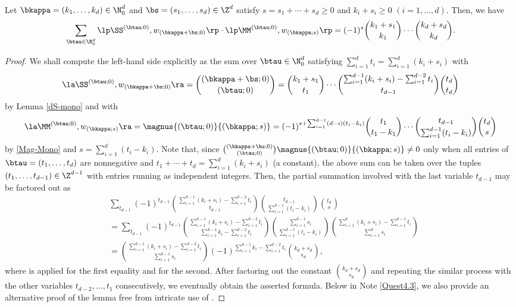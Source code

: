 \begin{Lemma} \label{lem2}
Let $\bkappa=(k_1,\dots,k_d)\in\N_0^d$ and $\bs=(s_1,\dots,s_d)\in \Z^d$
satisfy $s=s_1+\cdots+s_d\ge 0$ and $k_i+s_i\ge 0$ $(i=1,\dots,d)$.
Then,  we have
$$
\sum_{\btau\in\N_0^d} 
\lp\SS^{(\btau;0)},w_{(\bkappa+\bs;0)}\rp
\cdot \lp\MM^{(\btau;0)}, w_{(\bkappa;s)}\rp
=(-1)^s
\binom{k_1+s_1}{k_1}\cdots \binom{k_d+s_d}{k_d}.
$$
\end{Lemma}

\begin{proof}
We shall compute the left-hand side explicitly
as the sum over 
$\btau\in\N_0^d$ satisfying
$\sum_{i=1}^d t_i=\sum_{i=1}^d (k_i+s_i)$
with
$$
\la\SS^{(\btau;0)},w_{(\bkappa+\bs;0)}\ra=\binom{(\bkappa+\bs;0)}{(\btau;0)}
=\binom{k_1+s_1}{t_1} 
\cdots
\binom{\sum_{i=1}^{d-1}(k_i+s_i)-\sum_{i=1}^{d-2}t_i}{t_{d-1}}
\binom{t_d}{t_d}
$$
by Lemma \ref{dS-mono} and with
\small $$
\la\MM^{(\btau;0)}, w_{(\bkappa;s)}\ra
=\magnus{(\btau;0)}{(\bkappa;s)}
=(-1)^{s+\sum_{i=1}^{d-1}(d-i)(t_i-k_i)}
\binom{t_1}{t_1-k_1}
\cdots
\binom{t_{d-1}}{\sum_{i=1}^{d-1}(t_i-k_i)}
\binom{t_d}{s}
$$ \normalsize
by \eqref{Mag-Mono} and
$s=\sum_{i=1}^{d}(t_i-k_i)$. 
Note that,
since $\binom{(\bkappa+\bs;0)}{(\btau;0)}\magnus{(\btau;0)}{(\bkappa;s)}\ne 0$ 
only when all entries of $\btau=(t_1,\dots,t_d)$ are nonnegative
and $t_1+\cdots+t_d=\sum_{i=1}^d (k_i+s_i)$ (a constant),
the above sum
can be taken over the tuples $(t_1,\dots,t_{d-1})\in\Z^{d-1}$
with entries running as independent integers.
Then, the partial summation involved with the last variable 
$t_{d-1}$ may be factored out as
\small \begin{align*}
&\sum_{t_{d-1}}(-1)^{t_{d-1}}
\binom{\sum_{i=1}^{d-1}(k_i+s_i)-\sum_{i=1}^{d-2}t_i}{t_{d-1}}
\binom{t_{d-1}}{\sum_{i=1}^{d-1}(t_i-k_i)}
\binom{t_d}{s} \\
&=\sum_{t_{d-1}}(-1)^{t_{d-1}}
\binom{\sum_{i=1}^{d-1}(k_i+s_i)-\sum_{i=1}^{d-2}t_i}{ \sum_{i=1}^{d-1}k_i-\sum_{i=1}^{d-2}t_i }
\binom{\sum_{i=1}^{d-1} s_i}{\sum_{i=1}^{d-1}(t_i-k_i)}
\binom{\sum_{i=1}^d(k_i+s_i)-\sum_{i=1}^{d-1}t_i}{\sum_{i=1}^{d} s_i} \\
&=\binom{\sum_{i=1}^{d-1}(k_i+s_i)-\sum_{i=1}^{d-2}t_i}{\sum_{i=1}^{d-1} s_i}
(-1)^{\sum_{i=1}^{d-1}k_i -\sum_{i=1}^{d-2} t_i}
\binom{k_d+s_d}{s_d},
\end{align*} \normalsize
where \cite[(5.21)]{GKP} is applied for the first equality and 
\cite[(5.24)]{GKP} for the second.
After factoring out the constant $\binom{k_d+s_d}{s_d}$ and repeating
the similar process with the other variables $t_{d-2},\dots, t_1$ consecutively,
we eventually obtain the asserted formula.
Below in Note \ref{Quest4.3}, we also provide an alternative proof of the lemma 
free from intricate use of 
\cite[(5.21),(5.24)]{GKP}.
\end{proof}
